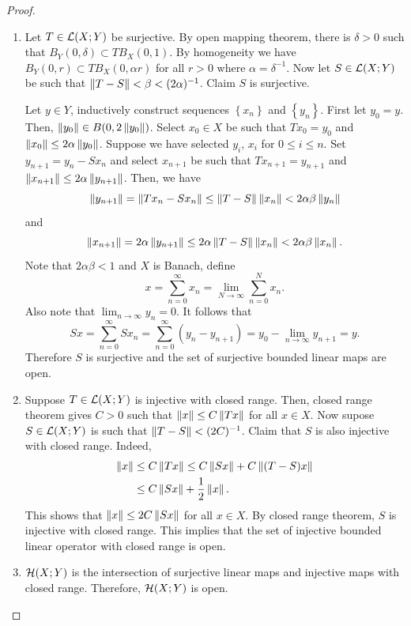 \documentclass[a4paper]{article}
\begin{document}
\begin{proof}
\begin{enumerate}
\item Let $T \in \mathcal{L}(X; Y)$ be surjective. By open mapping
theorem, there is $\delta > 0$ such that $B_Y(0, \delta)
\subset TB_X(0, 1)$. By homogeneity we have
$B_Y(0, r) \subset TB_X(0, \alpha r)$ for all $r > 0$ where
$\alpha = \delta^{-1}$. Now let $S \in \mathcal{L}(X; Y)$ be such that
$\left\lVert T - S\right\rVert < \beta < (2\alpha)^{-1}$. Claim $S$ is surjective.

Let $y \in Y$, inductively construct sequences $\left\{ x_n \right\}$
and $\left\{ y_n \right\}$. First let $y_0 = y$. Then,
$\left\lVert y_0\right\rVert \in B(0, 2\left\lVert y_0\right\rVert)$. Select
$x_0 \in X$ be such that $T x_0 = y_0$ and $\left\lVert x_0\right\rVert
\leq 2 \alpha \left\lVert y_0\right\rVert$. Suppose we have selected $y_i$,
$x_i$ for $0 \leq i \leq n$. Set $y_{n+1} = y_n - S x_n$
and select $x_{n+1}$ be such that $T x_{n+1} = y_{n+1}$
and $\left\lVert x_{n+1}\right\rVert \leq 2\alpha \left\lVert y_{n+1}\right\rVert$.
Then, we have
\[
\left\lVert y_{n+1}\right\rVert = \left\lVert T x_n - S x_n\right\rVert \leq
\left\lVert T - S\right\rVert \left\lVert x_n\right\rVert < 2 \alpha\beta \left\lVert y_n\right\rVert
\]
and
\[
\left\lVert x_{n+1}\right\rVert = 2 \alpha \left\lVert y_{n+1}\right\rVert \leq
2 \alpha \left\lVert T - S\right\rVert \left\lVert x_n\right\rVert < 2 \alpha \beta \left\lVert x_n\right\rVert.
\]
Note that $2 \alpha\beta < 1$ and $X$ is Banach, define
\[
x = \sum_{n=0}^\infty x_n = \lim_{N \to \infty}
\sum_{n = 0}^N x_n.
\]
Also note that $\lim_{n \to \infty} y_n = 0$. It follows
that
\[
S x = \sum_{n=0}^\infty S x_n
= \sum_{n=0}^\infty (y_n - y_{n+1})
= y_0 - \lim_{n \to \infty} y_{n+1} = y.
\]
Therefore $S$ is surjective and the set of surjective
bounded linear maps are open.

\item Suppose $T \in \mathcal{L}(X; Y)$ is injective with closed range.
Then, closed range theorem gives $C > 0$ such that
$\left\lVert x\right\rVert \leq C \left\lVert T x\right\rVert$ for all $x \in X$. Now supose
$S \in \mathcal{L}(X; Y)$ is such that $\left\lVert T - S\right\rVert < (2C)^{-1}$.
Claim that $S$ is also injective with closed range. Indeed,
\[
\begin{aligned}
  \left\lVert x\right\rVert &\leq C\left\lVert T x\right\rVert \leq C \left\lVert Sx\right\rVert + C \left\lVert (T-S)x\right\rVert \\
  & \leq C \left\lVert Sx\right\rVert + \frac{1}{2}\left\lVert x\right\rVert.
\end{aligned}
\]
This shows that $\left\lVert x\right\rVert \leq 2C \left\lVert Sx\right\rVert$ for all $x \in X$.
By closed range theorem, $S$ is injective with closed range.
This implies that the set of injective bounded linear operator
with closed range is open.

\item $\mathcal{H}(X; Y)$ is the intersection of surjective linear
maps and injective maps with closed range. Therefore, 
$\mathcal{H}(X; Y)$ is open.
\end{enumerate}

\end{proof}
\end{document}
